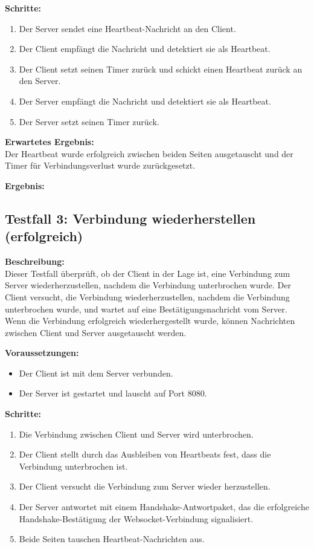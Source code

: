\documentclass[thesis.tex]{subfiles}
\begin{document}
\textbf{Schritte:}
\begin{enumerate}
    \item Der Server sendet eine Heartbeat-Nachricht an den Client.
    \item Der Client empfängt die Nachricht und detektiert sie als Heartbeat.
    \item Der Client setzt seinen Timer zurück und schickt einen Heartbeat zurück an den Server.
    \item Der Server empfängt die Nachricht und detektiert sie als Heartbeat.
    \item Der Server setzt seinen Timer zurück.
\end{enumerate}

\textbf{Erwartetes Ergebnis:}\\
Der Heartbeat wurde erfolgreich zwischen beiden Seiten ausgetauscht und der Timer für Verbindungsverlust wurde zurückgesetzt.

\textbf{Ergebnis:}\\



\subsection*{Testfall 3: Verbindung wiederherstellen (erfolgreich)}

\textbf{Beschreibung:}\\
Dieser Testfall überprüft, ob der Client in der Lage ist, eine Verbindung zum Server wiederherzustellen, nachdem die Verbindung unterbrochen wurde. Der Client versucht, die Verbindung wiederherzustellen, nachdem die Verbindung unterbrochen wurde, und wartet auf eine Bestätigungsnachricht vom Server. Wenn die Verbindung erfolgreich wiederhergestellt wurde, können Nachrichten zwischen Client und Server ausgetauscht werden.

\textbf{Voraussetzungen:}
\begin{itemize}
    \item Der Client ist mit dem Server verbunden.
    \item Der Server ist gestartet und lauscht auf Port 8080.
\end{itemize}

\textbf{Schritte:}
\begin{enumerate}
    \item Die Verbindung zwischen Client und Server wird unterbrochen.
    \item Der Client stellt durch das Ausbleiben von Heartbeats fest, dass die Verbindung unterbrochen ist.
    \item Der Client versucht die Verbindung zum Server wieder herzustellen.
    \item Der Server antwortet mit einem Handshake-Antwortpaket, das die erfolgreiche\\ Handshake-Bestätigung der Websocket-Verbindung signalisiert.
    \item Beide Seiten tauschen Heartbeat-Nachrichten aus.
\end{enumerate}
\end{document}
